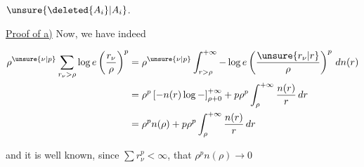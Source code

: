  $\unsure{\deleted{A_i}|A_i}$.


\uline{Proof of a)} Now, we have indeed


\[
\begin{aligned}
\rho^{\unsure{\nu|p}}\sum_{r_\nu>\rho}\log e\left(\frac{r_\nu}{\rho}\right)^p
&=\rho^{\unsure{\nu|p}}\int_{r>\rho}^{+\infty}-\log e\left(\frac{\unsure{r_\nu|r}}{\rho}\right)^p\,dn(r)\\
&=\rho^p\left[-n(r)\log-\right]_{\rho+0}^{+\infty}
+p\rho^p\int_\rho^{+\infty}\frac{n(r)}{r}\,dr\\
&=\rho^p n(\rho)+p\rho^p\int_\rho^{+\infty}\frac{n(r)}{r}\,dr
\end{aligned}
\]

and it is well known, since $\sum r_\nu^p<\infty$, that $\rho^p n(\rho)\to0$
